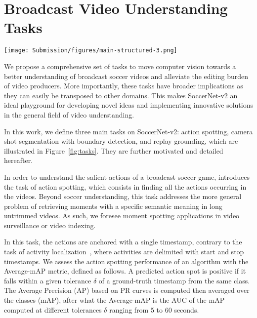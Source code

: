 \documentclass[final]{cvsports}
\begin{document}
 \section{Broadcast Video Understanding Tasks}

\begin{figure*}
    \centering
    \texttt{[image: Submission/figures/main-structured-3.png]}
    \caption{\textbf{Tasks overview.}
    We define a 17-class \textcolor{newanthogreen}{\textbf{action spotting}} task, a 13-class \textcolor{newanthoblue}{\textbf{camera shot segmentation}} and \textcolor{newanthoblue}{\textbf{boundary detection}} tasks, and a novel \textcolor{newanthored}{\textbf{replay grounding}} task, with their associated performance metrics. They respectively focus on \textcolor{newanthogreen}{\textbf{understanding the content}} of broadcast soccer games, addressing broadcast \textcolor{newanthoblue}{\textbf{video editing tasks}}, and \textcolor{newanthored}{\textbf{retrieving salient moments}} of the game.} \label{fig:tasks}
\end{figure*}


We propose a comprehensive set of tasks to move computer vision towards a better understanding of broadcast soccer videos and alleviate the editing burden of video producers. More importantly, these tasks have broader implications as they can easily be transposed to other domains. This makes SoccerNet-v2 an ideal playground for developing novel ideas and implementing innovative solutions in the general field of video understanding.

In this work, we define three main tasks on SoccerNet-v2: action spotting, camera shot segmentation with boundary detection, and replay grounding, which are illustrated in Figure~\ref{fig:tasks}. They are further motivated and detailed hereafter. 



In order to understand the salient actions of a broadcast soccer game, \SoccerNet introduces the task of action spotting, which consists in finding all the actions occurring in the videos. Beyond soccer understanding, this task addresses the more general problem of retrieving moments with a specific semantic meaning in long untrimmed videos. As such, we foresee moment spotting applications in \eg video surveillance or video indexing.

In this task, the actions are anchored with a single timestamp, contrary to the task of activity localization~\cite{caba2015activitynet}, where activities are delimited with start and stop timestamps. 
We assess the action spotting performance of an algorithm with the Average-mAP metric, defined as follows. A predicted action spot is positive if it falls within a given tolerance $\delta$ of a ground-truth timestamp from the same class. The Average Precision (AP) based on PR curves is computed then averaged over the classes (mAP), after what the Average-mAP is the AUC of the mAP computed at different tolerances $\delta$ 
ranging from 5 to 60 seconds. 
\end{document}
